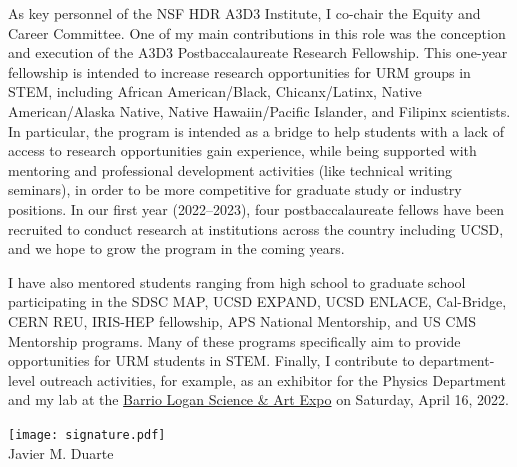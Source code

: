 \documentclass[11pt,letterpaper,notitlepage]{article}
\begin{document}
As key personnel of the NSF HDR A3D3 Institute, I co-chair the Equity and Career Committee.
One of my main contributions in this role was the conception and execution of the A3D3 Postbaccalaureate Research Fellowship.
This one-year fellowship is intended to increase research opportunities for URM groups in STEM, including African American/Black, Chicanx/Latinx, Native American/Alaska Native, Native Hawaiin/Pacific Islander, and Filipinx scientists.
In particular, the program is intended as a bridge to help students with a lack of access to research opportunities gain experience, while being supported with mentoring and professional development activities (like technical writing seminars), in order to be more competitive for graduate study or industry positions.
In our first year (2022--2023), four postbaccalaureate fellows have been recruited to conduct research at institutions across the country including UCSD, and we hope to grow the program in the coming years.

I have also mentored students ranging from high school to graduate school participating in the SDSC MAP, UCSD EXPAND, UCSD ENLACE, Cal-Bridge, CERN REU, IRIS-HEP fellowship, APS National Mentorship, and US CMS Mentorship programs.
Many of these programs specifically aim to provide opportunities for URM students in STEM.
Finally, I contribute to department-level outreach activities, for example, as an exhibitor for the Physics Department and my lab at the \href{https://www.barriologansae.com/}{Barrio Logan Science \& Art Expo} on Saturday, April 16, 2022.

\vspace{0.1in}
\texttt{[image: signature.pdf]}\\
\indent\indent Javier M. Duarte
\end{document}
